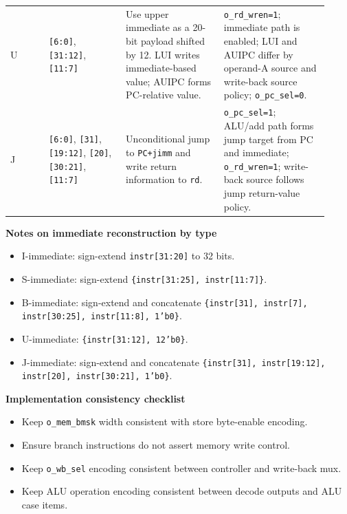 \documentclass[10pt,a4paper]{article}
\begin{document}
\begin{center}
\begin{tabular}{@{}p{0.11\linewidth}p{0.22\linewidth}p{0.29\linewidth}p{0.30\linewidth}@{}}
U & \texttt{[6:0]}, \texttt{[31:12]}, \texttt{[11:7]} &
Use upper immediate as a 20-bit payload shifted by 12. LUI writes immediate-based value; AUIPC forms PC-relative value. &
\texttt{o\_rd\_wren=1}; immediate path is enabled; LUI and AUIPC differ by operand-A source and write-back source policy; \texttt{o\_pc\_sel=0}. \\
\addlinespace
J & \texttt{[6:0]}, \texttt{[31]}, \texttt{[19:12]}, \texttt{[20]}, \texttt{[30:21]}, \texttt{[11:7]} &
Unconditional jump to \texttt{PC+jimm} and write return information to \texttt{rd}. &
\texttt{o\_pc\_sel=1}; ALU/add path forms jump target from PC and immediate; \texttt{o\_rd\_wren=1}; write-back source follows jump return-value policy. \\
\bottomrule
\end{tabular}
\end{center}

\textbf{Notes on immediate reconstruction by type}

\begin{itemize}
      \item I-immediate: sign-extend \texttt{instr[31:20]} to 32 bits.
      \item S-immediate: sign-extend \texttt{\{instr[31:25], instr[11:7]\}}.
      \item B-immediate: sign-extend and concatenate
                        \texttt{\{instr[31], instr[7], instr[30:25], instr[11:8], 1'b0\}}.
      \item U-immediate: \texttt{\{instr[31:12], 12'b0\}}.
      \item J-immediate: sign-extend and concatenate
                        \texttt{\{instr[31], instr[19:12], instr[20], instr[30:21], 1'b0\}}.
\end{itemize}

\textbf{Implementation consistency checklist}

\begin{itemize}
      \item Keep \texttt{o\_mem\_bmsk} width consistent with store byte-enable encoding.
      \item Ensure branch instructions do not assert memory write control.
      \item Keep \texttt{o\_wb\_sel} encoding consistent between controller and write-back mux.
      \item Keep ALU operation encoding consistent between decode outputs and ALU case items.
\end{itemize}
\end{document}
